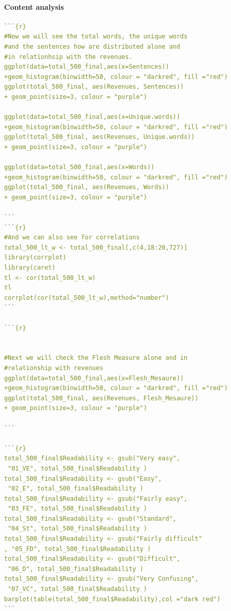\documentclass{article}
\begin{document}
\paragraph{Content analysis}\label{r: van: cont}
\begin{lstlisting}[language=R] 
```{r}
#Now we will see the total words, the unique words 
#and the sentences how are distributed alone and 
#in relationhsip with the revenues.
ggplot(data=total_500_final,aes(x=Sentences))
+geom_histogram(binwidth=50, colour = "darkred", fill ="red")
ggplot(total_500_final, aes(Revenues, Sentences)) 
+ geom_point(size=3, colour = "purple")

ggplot(data=total_500_final,aes(x=Unique.words))
+geom_histogram(binwidth=50, colour = "darkred", fill ="red")
ggplot(total_500_final, aes(Revenues, Unique.words)) 
+ geom_point(size=3, colour = "purple")

ggplot(data=total_500_final,aes(x=Words))
+geom_histogram(binwidth=50, colour = "darkred", fill ="red")
ggplot(total_500_final, aes(Revenues, Words)) 
+ geom_point(size=3, colour = "purple")

```
```{r}
#And we can also see for correlations
total_500_lt_w <- total_500_final[,c(4,18:20,727)]
library(corrplot)
library(caret)
tl <- cor(total_500_lt_w)
tl
corrplot(cor(total_500_lt_w),method="number")
```

```{r}


#Next we will check the Flesh Measure alone and in 
#relationship with revenues
ggplot(data=total_500_final,aes(x=Flesh_Mesaure))
+geom_histogram(binwidth=50, colour = "darkred", fill ="red")
ggplot(total_500_final, aes(Revenues, Flesh_Mesaure)) 
+ geom_point(size=3, colour = "purple")

```

```{r}
total_500_final$Readability <- gsub("Very easy",
 "01_VE", total_500_final$Readability )
total_500_final$Readability <- gsub("Easy",
 "02_E", total_500_final$Readability )
total_500_final$Readability <- gsub("Fairly easy",
 "03_FE", total_500_final$Readability )
total_500_final$Readability <- gsub("Standard",
 "04_St", total_500_final$Readability )
total_500_final$Readability <- gsub("Fairly difficult"
, "05_FD", total_500_final$Readability )
total_500_final$Readability <- gsub("Difficult",
 "06_D", total_500_final$Readability )
total_500_final$Readability <- gsub("Very Confusing",
 "07_VC", total_500_final$Readability )
barplot(table(total_500_final$Readability),col ="dark red")
```


\end{lstlisting}
\end{document}

